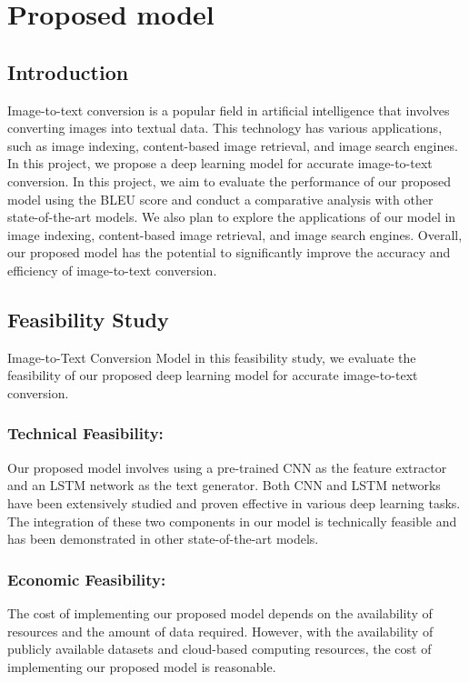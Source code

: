 \section{Proposed model}
\subsection{Introduction}
Image-to-text conversion is a popular field in artificial intelligence that involves converting images into textual data. This technology has various applications, such as image indexing, content-based image retrieval, and image search engines. In this project, we propose a deep learning model for accurate image-to-text conversion. In this project, we aim to evaluate the performance of our proposed model using the BLEU score and conduct a comparative analysis with other state-of-the-art models. We also plan to explore the applications of our model in image indexing, content-based image retrieval, and image search engines. Overall, our proposed model has the potential to significantly improve the accuracy and efficiency of image-to-text conversion.

\subsection{Feasibility Study}
Image-to-Text Conversion Model in this feasibility study, we evaluate the feasibility of our proposed deep learning model for accurate image-to-text conversion.
\subsubsection{Technical Feasibility:}
Our proposed model involves using a pre-trained CNN as the feature extractor and an LSTM network as the text generator. Both CNN and LSTM networks have been extensively studied and proven effective in various deep learning tasks. The integration of these two components in our model is technically feasible and has been demonstrated in other state-of-the-art models.
\subsubsection{Economic Feasibility:}
The cost of implementing our proposed model depends on the availability of resources and the amount of data required. However, with the availability of publicly available datasets and cloud-based computing resources, the cost of implementing our proposed model is reasonable.

